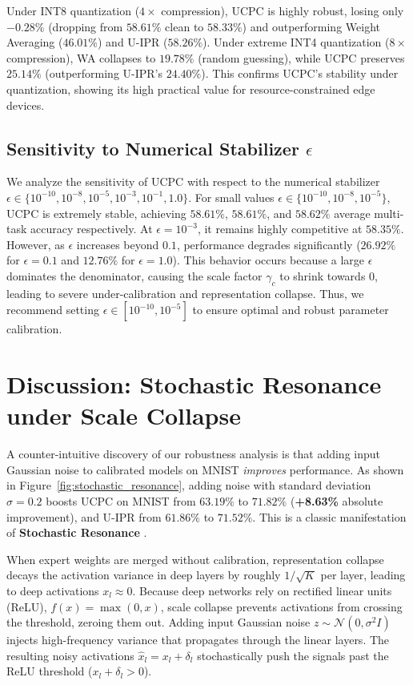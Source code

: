 \documentclass{article}
\theoremstyle{plain}
\theoremstyle{definition}
\theoremstyle{remark}
\begin{document}
Under INT8 quantization ($4\times$ compression), UCPC is highly robust, losing only $-0.28\%$ (dropping from $58.61\%$ clean to $58.33\%$) and outperforming Weight Averaging ($46.01\%$) and U-IPR ($58.26\%$). Under extreme INT4 quantization ($8\times$ compression), WA collapses to $19.78\%$ (random guessing), while UCPC preserves $25.14\%$ (outperforming U-IPR's $24.40\%$). This confirms UCPC's stability under quantization, showing its high practical value for resource-constrained edge devices.

\subsection{Sensitivity to Numerical Stabilizer \texorpdfstring{$\epsilon$}{epsilon}}
We analyze the sensitivity of UCPC with respect to the numerical stabilizer $\epsilon \in \{10^{-10}, 10^{-8}, 10^{-5}, 10^{-3}, 10^{-1}, 1.0\}$.
For small values $\epsilon \in \{10^{-10}, 10^{-8}, 10^{-5}\}$, UCPC is extremely stable, achieving $58.61\%$, $58.61\%$, and $58.62\%$ average multi-task accuracy respectively.
At $\epsilon=10^{-3}$, it remains highly competitive at $58.35\%$.
However, as $\epsilon$ increases beyond $0.1$, performance degrades significantly ($26.92\%$ for $\epsilon=0.1$ and $12.76\%$ for $\epsilon=1.0$).
This behavior occurs because a large $\epsilon$ dominates the denominator, causing the scale factor $\gamma_c$ to shrink towards 0, leading to severe under-calibration and representation collapse.
Thus, we recommend setting $\epsilon \in [10^{-10}, 10^{-5}]$ to ensure optimal and robust parameter calibration.

\section{Discussion: Stochastic Resonance under Scale Collapse}
\label{sec:discussion}

A counter-intuitive discovery of our robustness analysis is that adding input Gaussian noise to calibrated models on MNIST \textit{improves} performance. As shown in Figure~\ref{fig:stochastic_resonance}, adding noise with standard deviation $\sigma=0.2$ boosts UCPC on MNIST from $63.19\%$ to $71.82\%$ (\textbf{+8.63\%} absolute improvement), and U-IPR from $61.86\%$ to $71.52\%$. This is a classic manifestation of \textbf{Stochastic Resonance} \cite{benzi81, gamal98}.

When expert weights are merged without calibration, representation collapse decays the activation variance in deep layers by roughly $1/\sqrt{K}$ per layer, leading to deep activations $x_l \approx 0$. Because deep networks rely on rectified linear units (ReLU), $f(x) = \max(0, x)$, scale collapse prevents activations from crossing the threshold, zeroing them out. Adding input Gaussian noise $z \sim \mathcal{N}(0, \sigma^2 I)$ injects high-frequency variance that propagates through the linear layers. The resulting noisy activations $\hat{x}_l = x_l + \delta_l$ stochastically push the signals past the ReLU threshold ($x_l + \delta_l > 0$).
\end{document}

